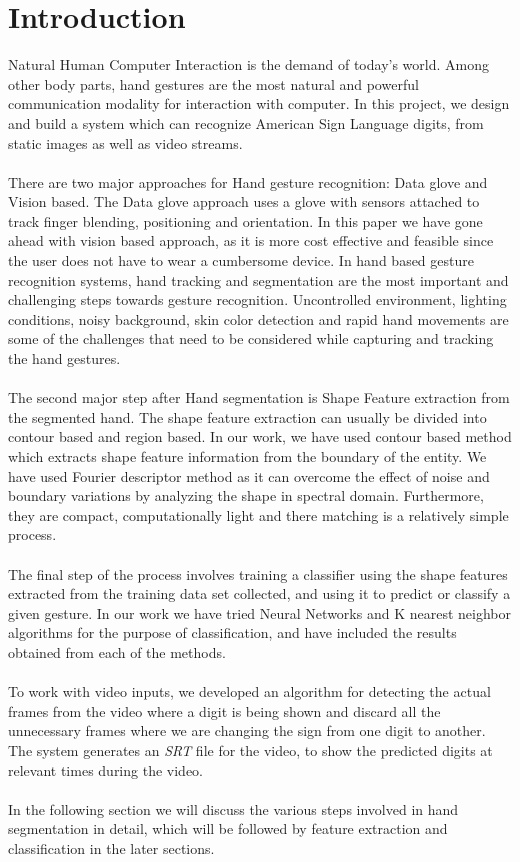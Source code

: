 \documentclass{acm} %
\begin{document}
\section{Introduction}
Natural Human Computer Interaction is the demand of today's world. Among other body parts, hand gestures are the most natural and powerful communication modality for interaction with computer. In this project, we design and build a system which can recognize American Sign Language digits, from static images as well as video streams.\\
\\
There are two major approaches for Hand gesture recognition: Data glove and Vision based. The Data glove approach uses a glove with sensors attached to track finger blending, positioning and orientation. In this paper we have gone ahead with vision based approach, as it is more cost effective and feasible since the user does not have to wear a cumbersome device. In hand based gesture recognition systems, hand tracking and segmentation are the most important and challenging steps towards gesture recognition. Uncontrolled environment, lighting conditions, noisy background, skin color detection and rapid hand movements are some of the challenges that need to be considered while capturing and tracking the hand gestures.\\
\\
The second major step after Hand segmentation is Shape Feature extraction from the segmented hand. The shape feature extraction can usually be divided into contour based and region based. In our work, we have used contour based method which extracts shape feature information from the boundary of the entity. We have used Fourier descriptor method as it can overcome the effect of noise and boundary variations by analyzing the shape in spectral domain. Furthermore, they are compact, computationally light and there matching is a relatively simple process.\\
\\
The final step of the process involves training a classifier using the shape features extracted from the training data set collected, and using it to predict or classify a given gesture. In our work we have tried Neural Networks and K nearest neighbor algorithms for the purpose of classification, and have included the results obtained from each of the methods.\\
\\
To work with video inputs, we developed an algorithm for detecting the actual frames from the video where a digit is being shown and discard all the unnecessary frames where we are changing the sign from one digit to another. The system generates an \textit{SRT} file for the video, to show the predicted digits at relevant times during the video.\\
\\
In the following section we will discuss the various steps involved in hand segmentation in detail, which will be followed by feature extraction and classification in the later sections.
\end{document}

